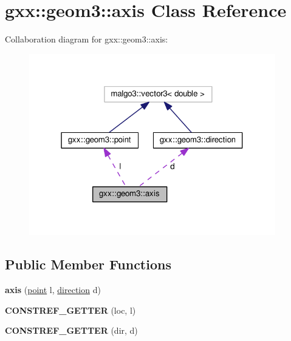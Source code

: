 \hypertarget{classgxx_1_1geom3_1_1axis}{}\section{gxx\+:\+:geom3\+:\+:axis Class Reference}
\label{classgxx_1_1geom3_1_1axis}


Collaboration diagram for gxx\+:\+:geom3\+:\+:axis\+:
\nopagebreak
\begin{figure}[H]
\begin{center}
\leavevmode
\includegraphics[width=304pt]{classgxx_1_1geom3_1_1axis__coll__graph}
\end{center}
\end{figure}
\subsection*{Public Member Functions}
\begin{DoxyCompactItemize}
\item 
{\bfseries axis} (\hyperlink{classgxx_1_1geom3_1_1point}{point} l, \hyperlink{classgxx_1_1geom3_1_1direction}{direction} d)\hypertarget{classgxx_1_1geom3_1_1axis_a08fd792af64f78466f31809fbbc646a6}{}\label{classgxx_1_1geom3_1_1axis_a08fd792af64f78466f31809fbbc646a6}

\item 
{\bfseries C\+O\+N\+S\+T\+R\+E\+F\+\_\+\+G\+E\+T\+T\+ER} (loc, l)\hypertarget{classgxx_1_1geom3_1_1axis_adee32a748ca587261f8a7b7f74510b12}{}\label{classgxx_1_1geom3_1_1axis_adee32a748ca587261f8a7b7f74510b12}

\item 
{\bfseries C\+O\+N\+S\+T\+R\+E\+F\+\_\+\+G\+E\+T\+T\+ER} (dir, d)\hypertarget{classgxx_1_1geom3_1_1axis_a5a23fb24c936dbef75e07a92182f4df7}{}\label{classgxx_1_1geom3_1_1axis_a5a23fb24c936dbef75e07a92182f4df7}

\end{DoxyCompactItemize}
